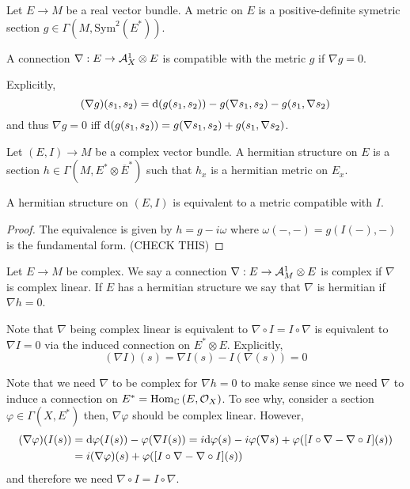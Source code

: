 \documentclass[12pt]{article}
\begin{document}
\begin{defn}
Let $E \to M$ be a real vector bundle. A metric on $E$ is a positive-definite symetric section $g \in \Gamma(M, \mathrm{Sym}^2(E^*))$.
\end{defn}

\begin{defn}
A connection $\nabla : E \to \mathcal{A}^1_X \otimes E$ is compatible with the metric $g$ if $\nabla g = 0$. 
\end{defn}

\begin{rmk}
Explicitly, 
\[ (\nabla g)(s_1, s_2) = \mathrm{d}{(g(s_1, s_2))} - g(\nabla s_1, s_2) - g(s_1, \nabla s_2) \]
and thus $\nabla g = 0$ iff $\mathrm{d}{(g(s_1, s_2))} = g(\nabla s_1, s_2) + g(s_1, \nabla s_2)$.
\end{rmk}

\begin{defn}
Let $(E, I) \to M$ be a complex vector bundle. A hermitian structure on $E$ is a section $h \in \Gamma(M, E^* \otimes \overline{E}^*)$ such that $h_x$ is a hermitian metric on $E_x$.
\end{defn}

\begin{prop}
A hermitian structure on $(E, I)$ is equivalent to a metric compatible with $I$.
\end{prop}

\begin{proof}
The equivalence is given by $h = g - i \omega$ where $\omega(-,-) = g(I(-),-)$ is the fundamental form. (CHECK THIS)
\end{proof}

\begin{defn}
Let $E \to M$ be complex. We say a connection $\nabla : E \to \mathcal{A}^1_M \otimes E$ is complex if $\nabla$ is complex linear. If $E$ has a hermitian structure we say that $\nabla$ is hermitian if $\nabla h = 0$.
\end{defn}

\begin{rmk}
Note that $\nabla$ being complex linear is equivalent to $\nabla \circ I = I \circ \nabla$ is equivalent to $\nabla I = 0$ via the induced connection on $E^* \otimes E$. Explicitly,
\[ (\nabla I)(s) = \nabla I(s) - I(\nabla(s)) = 0 \]
\end{rmk}

\begin{rmk}
Note that we need $\nabla$ to be complex for $\nabla h = 0$ to make sense since we need $\nabla$ to induce a connection on $E^* = \mathrm{Hom}_{\mathbb{C}} \left( E, \mathcal{O}_{X} \right)$. To see why, consider a section $\varphi \in \Gamma(X, E^*)$ then, $\nabla \varphi$ should be complex linear. However,
\begin{align*}
(\nabla \varphi)(I(s)) & = \mathrm{d}{\varphi(I(s))} - \varphi(\nabla I(s)) = i \mathrm{d}{\varphi(s)} - i \varphi(\nabla s) + \varphi([I \circ \nabla - \nabla \circ I](s))
\\
& = i (\nabla \varphi)(s) + \varphi([I \circ \nabla - \nabla \circ I](s))
\end{align*}
and therefore we need $\nabla \circ I = I \circ \nabla$.
\end{rmk}
\end{document}
